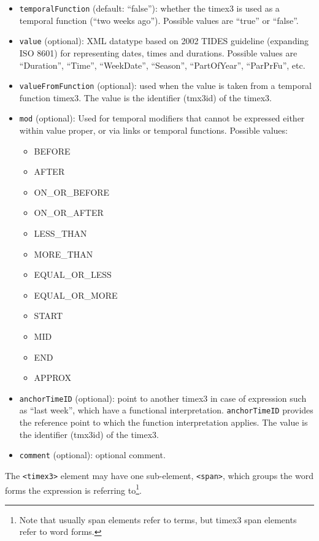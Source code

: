\begin{itemize}
\begin{tabular}{|c|p{9cm}|}
  \end{tabular}

\item \texttt{temporalFunction} (default: ``false''): whether the timex3 is
  used as a temporal function (``two weeks ago''). Possible values are
  ``true'' or ``false''.

\item \texttt{value} (optional): XML datatype based on 2002 TIDES guideline
  (expanding ISO 8601) for representing dates, times and durations. Possible
  values are ``Duration'', ``Time'', ``WeekDate'', ``Season'',
  ``PartOfYear'', ``ParPrFu'', etc.

\item \texttt{valueFromFunction} (optional): used when the value is taken
  from a temporal function timex3. The value is the identifier (tmx3id) of
  the timex3.

\item \texttt{mod} (optional): Used for temporal modifiers that cannot be
  expressed either within value proper, or via links or temporal
  functions. Possible values:
  \begin{itemize}
  \item BEFORE
  \item AFTER
  \item ON\_OR\_BEFORE
  \item ON\_OR\_AFTER
  \item LESS\_THAN
  \item MORE\_THAN
  \item EQUAL\_OR\_LESS
  \item EQUAL\_OR\_MORE
  \item START
  \item MID
  \item END
  \item APPROX
  \end{itemize}

\item \texttt{anchorTimeID} (optional): point to another timex3 in case of
  expression such as ``last week'', which have a functional
  interpretation. \texttt{anchorTimeID} provides the reference point to
  which the function interpretation applies. The value is the identifier
  (tmx3id) of the timex3.
\item \texttt{comment} (optional): optional comment.
\end{itemize}

The \texttt{<timex3>} element may have one sub-element, \texttt{<span>},
which groups the word forms the expression is referring to\footnote{Note
  that usually span elements refer to terms, but timex3 span elements refer
  to word forms.}.

